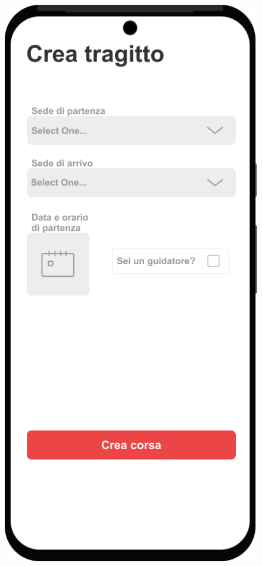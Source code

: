 \begin{figure}[H]
    \centering
    \begin{minipage}{0.45\textwidth}
        \centering
        \includegraphics[width=\linewidth]{Images/Crea tragitto.png}

\end{minipage}
\end{figure}
